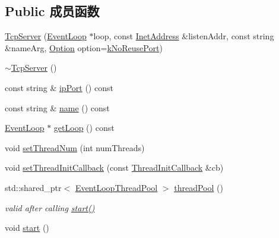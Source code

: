 \subsection*{Public 成员函数}
\begin{DoxyCompactItemize}
\item 
\hyperlink{classmuduo_1_1net_1_1TcpServer_a72055d50f174524110cbf73bc2deffcd}{Tcp\+Server} (\hyperlink{classmuduo_1_1net_1_1EventLoop}{Event\+Loop} $\ast$loop, const \hyperlink{classmuduo_1_1net_1_1InetAddress}{Inet\+Address} \&listen\+Addr, const string \&name\+Arg, \hyperlink{classmuduo_1_1net_1_1TcpServer_a0e65ad13124ea2cb5e255b640464e35f}{Option} option=\hyperlink{classmuduo_1_1net_1_1TcpServer_a0e65ad13124ea2cb5e255b640464e35fa5ddf56db99b3883a1c729e8b6873bbf5}{k\+No\+Reuse\+Port})
\item 
\hyperlink{classmuduo_1_1net_1_1TcpServer_a4eb415b51f7d85a5d4ac91370d0cbb00}{$\sim$\+Tcp\+Server} ()
\item 
const string \& \hyperlink{classmuduo_1_1net_1_1TcpServer_a99f658558edfb2a41612ef7be6884674}{ip\+Port} () const
\item 
const string \& \hyperlink{classmuduo_1_1net_1_1TcpServer_a47f4f0a66d5a539e687100dc65462ced}{name} () const
\item 
\hyperlink{classmuduo_1_1net_1_1EventLoop}{Event\+Loop} $\ast$ \hyperlink{classmuduo_1_1net_1_1TcpServer_aef1cbfe0592e8196e6c81b4db82a39ce}{get\+Loop} () const
\item 
void \hyperlink{classmuduo_1_1net_1_1TcpServer_a83bb28d139df96ba9fc449b4643f2c36}{set\+Thread\+Num} (int num\+Threads)
\item 
void \hyperlink{classmuduo_1_1net_1_1TcpServer_a84d15097874230451cf54685b8363458}{set\+Thread\+Init\+Callback} (const \hyperlink{classmuduo_1_1net_1_1TcpServer_a4665880f4633f1e7d95fd6fef6811717}{Thread\+Init\+Callback} \&cb)
\item 
std\+::shared\+\_\+ptr$<$ \hyperlink{classmuduo_1_1net_1_1EventLoopThreadPool}{Event\+Loop\+Thread\+Pool} $>$ \hyperlink{classmuduo_1_1net_1_1TcpServer_a403b616dd4691216b49bb8a13a6e8dd6}{thread\+Pool} ()
\begin{DoxyCompactList}\small\item\em valid after calling \hyperlink{classmuduo_1_1net_1_1TcpServer_a60de64d75454385b23995437f1d72669}{start()} \end{DoxyCompactList}\item 
void \hyperlink{classmuduo_1_1net_1_1TcpServer_a60de64d75454385b23995437f1d72669}{start} ()
\item 

\end{DoxyCompactItemize}
